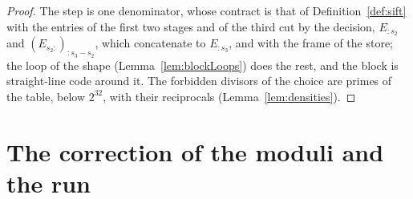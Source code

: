 \begin{proof}
  \leanok
  The step is one denominator, whose contract is that of Definition~\ref{def:sift} with the entries
  of the first two stages and of the third cut by the decision, $E_{:s_2}$ and
  $(E_{s_2:})_{:s_3 - s_2}$, which concatenate to $E_{:s_3}$, and with the frame of the store; the
  loop of the shape (Lemma~\ref{lem:blockLoops}) does the rest, and the block is straight-line code
  around it. The forbidden divisors of the choice are primes of the table, below $2^{32}$, with
  their reciprocals (Lemma~\ref{lem:densities}).
\end{proof}

\section{The correction of the moduli and the run}\label{sec:correction}

